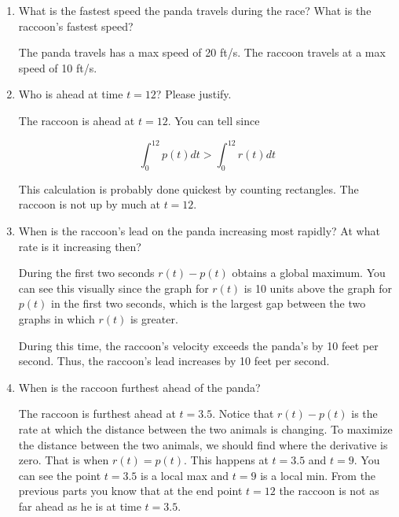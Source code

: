 \documentclass{article}
\begin{document}
\begin{enumerate}
\begin{enumerate}
  \item What is the fastest speed the panda travels during the race?  What is the raccoon's fastest speed? \vfill
  \begin{solution} 
  The panda travels has a max speed of 20 ft/s. The raccoon travels at a max speed of 10 ft/s. 
  \end{solution} 
  
  \item  Who is ahead at time $t=12$? Please justify.\vfill
   
\begin{solution} 
The raccoon is ahead at $t=12$. You can tell since 

$$\int_{0}^{12} p(t) dt > \int_{0}^{12} r(t) dt$$

This calculation is probably done quickest by counting rectangles. The raccoon is not up by much at $t=12$.
\end{solution} 


  \item  When is the raccoon's lead on the panda increasing most rapidly?  At what rate is it increasing then?\vfill
    
\begin{solution} 
During the first two seconds $r(t) - p(t)$ obtains a global maximum. You can see this visually since the graph for $r(t)$ is 10 units above the graph for $p(t)$ in the first two seconds, which is the largest gap between the two graphs in which $r(t)$ is greater. 

During this time, the raccoon's velocity exceeds the panda's by 10 feet per second. Thus, the raccoon's lead increases by 10 feet per second. 

\end{solution} 

  \item When is the raccoon furthest ahead of the panda?

  \probonly{\vfill}
    
\begin{solution} 
The raccoon is furthest ahead at $t=3.5$. Notice that $r(t) - p(t)$ is the rate at which the distance between the two animals is changing. To maximize the distance between the two animals, we should find where the derivative is zero. That is when $r(t) = p(t)$. This happens at $t=3.5$ and $t=9$. You can see the point $t=3.5$ is a local max and $t=9$ is a local min. From the previous parts you know that at the end point $t=12$ the raccoon is not as far ahead as he is at time $t=3.5$. 


\end{solution}
\end{enumerate}
\end{enumerate}
\end{document}

